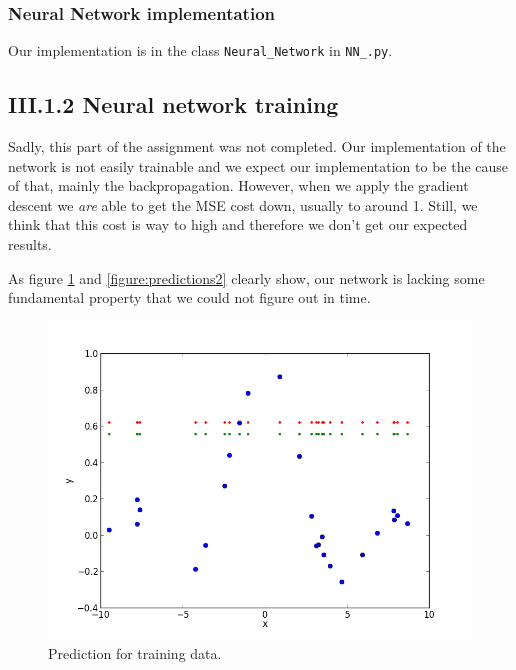 \documentclass[12pt]{article}
\begin{document}
    \subsubsection*{Neural Network implementation}

      Our implementation is in the class \texttt{Neural\_Network} in \texttt{NN\_.py}.

  \subsection*{III.1.2 Neural network training}

    Sadly, this part of the assignment was not completed. Our implementation of the network is not easily trainable and we expect our implementation to be the cause of that, mainly the backpropagation. However, when we apply the gradient descent we \textit{are} able to get the MSE cost down, usually to around 1. Still, we think that this cost is way to high and therefore we don't get our expected results.

    As figure \ref{figure:predictions} and \ref{figure:predictions2} clearly show, our network is lacking some fundamental property that we could not figure out in time.

    \begin{figure}[h]
      \centering
      \includegraphics[width =1\textwidth]{figures/predictions.png}
      \caption{Prediction for training data.}
      \label{figure:predictions}
    \end{figure}
\end{document}
